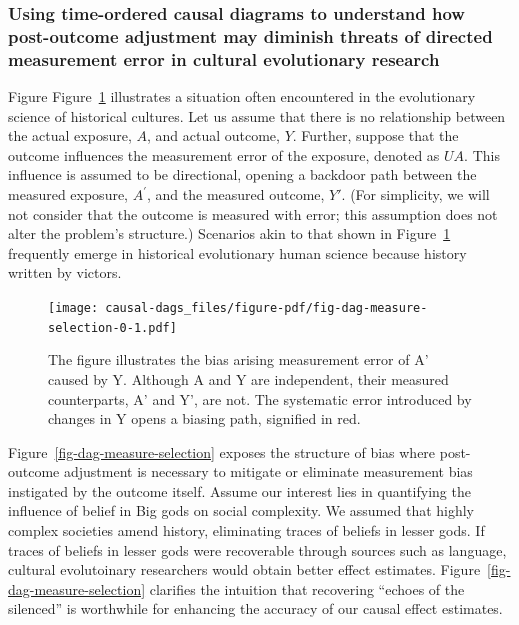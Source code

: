 \documentclass[
  singlecolumn]{article}
\begin{document}
\hypertarget{using-time-ordered-causal-diagrams-to-understand-how-post-outcome-adjustment-may-diminish-threats-of-directed-measurement-error-in-cultural-evolutionary-research}{%
\subsubsection{Using time-ordered causal diagrams to understand how
post-outcome adjustment may diminish threats of directed measurement
error in cultural evolutionary
research}\label{using-time-ordered-causal-diagrams-to-understand-how-post-outcome-adjustment-may-diminish-threats-of-directed-measurement-error-in-cultural-evolutionary-research}}

Figure Figure~\ref{fig-dag-measure-selection-0} illustrates a situation
often encountered in the evolutionary science of historical cultures.
Let us assume that there is no relationship between the actual exposure,
\(A\), and actual outcome, \(Y\). Further, suppose that the outcome
influences the measurement error of the exposure, denoted as \(UA\).
This influence is assumed to be directional, opening a backdoor path
between the measured exposure, \(A^{\prime}\), and the measured outcome,
\(Y'\). (For simplicity, we will not consider that the outcome is
measured with error; this assumption does not alter the problem's
structure.) Scenarios akin to that shown in
Figure~\ref{fig-dag-measure-selection-0} frequently emerge in historical
evolutionary human science because history written by victors.

\begin{figure}

{\centering \texttt{[image: causal-dags\_files/figure-pdf/fig-dag-measure-selection-0-1.pdf]}

}

\caption{\label{fig-dag-measure-selection-0}The figure illustrates the
bias arising measurement error of A' caused by Y. Although A and Y are
independent, their measured counterparts, A' and Y', are not. The
systematic error introduced by changes in Y opens a biasing path,
signified in red.}

\end{figure}

Figure~\ref{fig-dag-measure-selection} exposes the structure of bias
where post-outcome adjustment is necessary to mitigate or eliminate
measurement bias instigated by the outcome itself. Assume our interest
lies in quantifying the influence of belief in Big gods on social
complexity. We assumed that highly complex societies amend history,
eliminating traces of beliefs in lesser gods. If traces of beliefs in
lesser gods were recoverable through sources such as language, cultural
evolutoinary researchers would obtain better effect estimates.
Figure~\ref{fig-dag-measure-selection} clarifies the intuition that
recovering ``echoes of the silenced'' is worthwhile for enhancing the
accuracy of our causal effect estimates.
\end{document}

